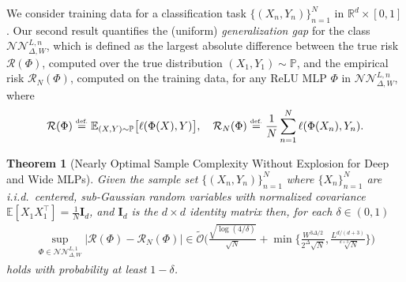 \documentclass{article}
\numberwithin{equation}{section}
\newtheorem{theorem}{Theorem}[section]
\theoremstyle{definition}
\newcommand{\eqdef}{\ensuremath{\stackrel{\mbox{\upshape\tiny def.}}{=}}}
\begin{document}
We consider training data for a classification task $\{(X_n,Y_n)\}_{n=1}^N$ in $\mathbb{R}^d\times [0,1]$.  Our second result quantifies the (uniform) \textit{generalization gap} for the class $\mathcal{NN}_{\Delta,W}^{L,n}$, which is defined as the largest absolute difference between the true risk $\mathcal{R}(\Phi)$, computed over the true distribution $(X_1,Y_1)\sim \mathbb{P}$, and the empirical risk $\mathcal{R}_N(\Phi)$, computed on the training data, for any ReLU MLP $\Phi$ in $\mathcal{NN}_{\Delta,W}^{L,n}$, where
\begin{equation*}
    \mathcal{R}(\Phi) \eqdef \mathbb{E}_{(X,Y)\sim \mathbb{P}}\big[\ell(\Phi(X),Y)\big]
    ,\quad
    \mathcal{R}_N(\Phi) \eqdef \frac1{N}\sum_{n=1}^N\ell(\Phi(X_n),Y_n)
.
\end{equation*}
\begin{theorem}[Nearly Optimal Sample Complexity Without Explosion for Deep and Wide MLPs]
\label{thm:RademacherBound__IntroVersion}
Given the sample set $\{(X_n,Y_n)\}_{n=1}^N$ where $\{X_n\}_{n=1}^N$ are i.i.d.\ centered, sub-Gaussian random variables with normalized covariance $\mathbb{E}[X_1X_1^{\top}]=\frac{1}{N}\mathbf{I}_d$, and $\mathbf{I}_d$ is the $d\times d$ identity matrix then, for each $\delta \in (0,1)$ 
\begin{equation*}
\begin{aligned}
    \sup_{\Phi\in \mathcal{NN}_{\Delta,W}^{L,1}} \big|\mathcal{R}(\Phi)-\mathcal{R}_N(\Phi)\big|
\in 
    \tilde{\mathcal{O}}\Biggl(
            \frac{
                \sqrt{\log(4/\delta)}
            }{\sqrt{N}}
    +
        \min\biggl\{
                \frac{
                    W^{3\Delta/2}
                }{
                    2^{\Delta}
                    \sqrt{N}
                }
        ,
                \frac{
                    L^{d/(d+3)}
                }{\sqrt[d+3]{N}}
        \biggr\}
    \Biggr)
\end{aligned}
\end{equation*}
holds with probability at least $1-\delta$.
\end{theorem}
\end{document}
